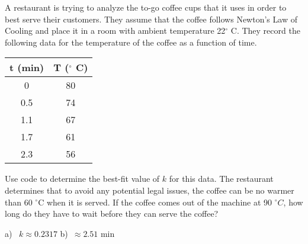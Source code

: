 \begin{exercise}
A restaurant is trying to analyze the to-go coffee cups that it uses in order to best serve their customers. They assume that the coffee follows Newton's Law of Cooling and place it in a room with ambient temperature 22$^\circ$ C. They record the following data for the temperature of the coffee as a function of time.
\begin{table}[h!!]
    \centering
    \begin{tabular}{|c|c|}\hline
         \textbf{t} (min)& \textbf{T} ($^\circ$ C)  \\ \hline
        0 & 80 \\
         0.5 & 74 \\
         1.1 & 67 \\
         1.7 & 61 \\
         2.3 & 56 \\ \hline
    \end{tabular}
\end{table}
\begin{tasks}
\task Use code to determine the best-fit value of $k$ for this data.
\task The restaurant determines that to avoid any potential legal issues, the coffee can be no warmer than 60 $^\circ$C when it is served. If the coffee comes out of the machine at 90 $^\circ C$, how long do they have to wait before they can serve the coffee?
\end{tasks}
\end{exercise}
\comboSol{%
}
{%
a)~ $k \approx 0.2317$ \quad b)~$\approx 2.51$ min
}

\newpage

